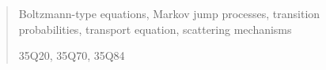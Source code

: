 \documentclass[a4paper]{article}
\theoremstyle{Theorem}\newtheorem{proposition}{Proposition}[section]
\theoremstyle{Remark}\newtheorem{remark}{Remark}[section]
\theoremstyle{Theorem}\newtheorem{theorem}{Theorem}[section]
\newcommand{\hv}{\hat{v}}
\newcommand{\tv}{\tilde{v}}
\begin{document}
\begin{abstract}

\medskip

 Boltzmann-type equations, Markov jump processes, transition probabilities, transport equation, scattering mechanisms  
\medskip

 35Q20, 35Q70, 35Q84
\end{abstract}



\end{document}
